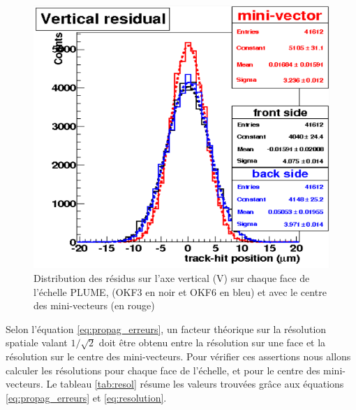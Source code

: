   \medskip
  
  \begin{figure}[!htb]
   \begin{center} 
    \includegraphics[scale=0.42]{./figures/PLUME_mini-vecteurs.png}
    \caption{Distribution des r\'esidus sur l'axe vertical (V) sur chaque face de l'\'echelle PLUME, (OKF3 en noir et OKF6 en bleu) et avec le centre des mini-vecteurs (en rouge)}
    \label{fig:resMiniVect}
   \end{center}
  \end{figure}
  
  Selon l'\'equation \ref{eq:propag_erreurs}, un facteur th\'eorique sur la r\'esolution spatiale valant $1/\sqrt{2}$ doit \^etre obtenu entre la r\'esolution sur une face et la r\'esolution sur le centre des mini-vecteurs. Pour v\'erifier ces assertions nous allons calculer les r\'esolutions pour chaque face de l'échelle, et pour le centre des mini-vecteurs. Le tableau \ref{tab:resol} r\'esume les valeurs trouv\'ees gr\^ace aux équations \ref{eq:propag_erreurs} et \ref{eq:resolution}.
  
